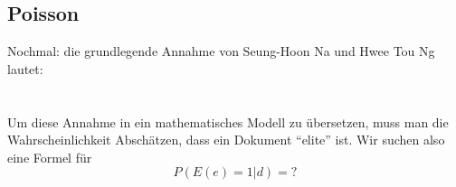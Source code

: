 \subsection{Poisson}
Nochmal: die grundlegende Annahme von Seung-Hoon Na und Hwee Tou Ng lautet:\\
\\
\\
Um diese Annahme in ein mathematisches Modell zu übersetzen, muss man die Wahrscheinlichkeit Abschätzen, dass ein Dokument ``elite'' ist. Wir suchen also eine Formel für
\[P\left( E\left( e \right)=1|d \right)=?\]

